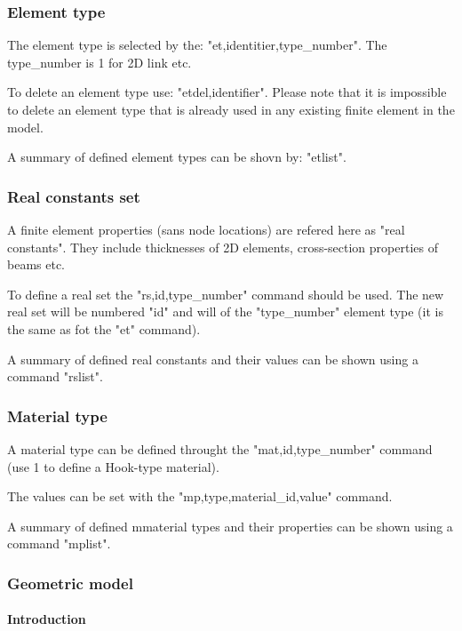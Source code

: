 \documentclass{article}
\begin{document}
\subsubsection{Element type}

 The element type is selected by the: "et,identitier,type\_number".
 The type\_number is 1 for 2D link etc. 

 To delete an element type use: "etdel,identifier". Please note
 that it is impossible to delete an element type that is already
 used in any existing finite element in the model.

 A summary of defined element types can be shovn by: "etlist".



\subsubsection{Real constants set}

 A finite element properties (sans node locations) are refered
 here as "real constants". They include thicknesses of 2D
 elements, cross-section properties of beams etc.

 To define a real set the "rs,id,type\_number" command should be used.
 The new real set will be numbered "id" and will of the "type\_number"
 element type (it is the same as fot the "et" command).

 A summary of defined real constants and their
 values can be shown using a command "rslist".



\subsubsection{Material type}

 A material type can be defined throught the "mat,id,type\_number"
 command (use 1 to define a Hook-type material).

 The values can be set with the "mp,type,material\_id,value"
 command.

 A summary of defined mmaterial types and their properties
 can be shown using a command "mplist".



\subsubsection{Geometric model}

\paragraph{Introduction}
\end{document}
